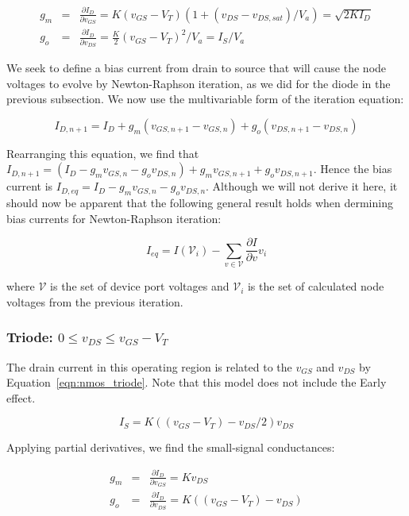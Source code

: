 \documentclass{article}
\begin{document}
\begin{eqnarray}
g_m&=&\frac{\partial I_D}{\partial v_{GS}}=K(v_{GS}-V_T)(1+(v_{DS}-v_{DS,sat})/V_a)=\sqrt{2KI_D} \\
g_o&=&\frac{\partial I_D}{\partial v_{DS}}=\frac{K}{2}(v_{GS}-V_T)^2 / V_a=I_S/V_a
\end{eqnarray}

We seek to define a bias current from drain to source that will cause the node voltages to evolve by Newton-Raphson iteration, as we did for the diode in the previous subsection.  We now use the multivariable form of the iteration equation:

\begin{equation}
I_{D,n+1}=I_D+g_m(v_{GS,n+1}-v_{GS,n})+g_o(v_{DS,n+1}-v_{DS,n})
\end{equation}

Rearranging this equation, we find that $I_{D,n+1}=(I_D-g_mv_{GS,n}-g_ov_{DS,n})+g_mv_{GS,n+1}+g_ov_{DS,n+1}$.  Hence the bias current is $I_{D,eq}=I_D-g_mv_{GS,n}-g_ov_{DS,n}$.  Although we will not derive it here, it should now be apparent that the following general result holds when dermining bias currents for Newton-Raphson iteration:

\begin{equation}
\label{eqn:bias_current}
I_{eq}=I(\mathcal{V}_i)-\sum_{v \in \mathcal{V}}\frac{\partial I}{\partial v}v_i
\end{equation}

where $\mathcal{V}$ is the set of device port voltages and $\mathcal{V}_i$ is the set of calculated node voltages from the previous iteration.

\subsubsection{Triode: $ 0 \leq v_{DS} \leq v_{GS}-V_T $}

The drain current in this operating region is related to the $v_{GS}$ and $v_{DS}$ by Equation~\ref{eqn:nmos_triode}.  Note that this model does not include the Early effect.

\begin{equation}
\label{eqn:nmos_triode}
I_S=K((v_{GS}-V_T)-v_{DS}/2)v_{DS}
\end{equation}

Applying partial derivatives, we find the small-signal conductances:

\begin{eqnarray}
g_m&=&\frac{\partial I_D}{\partial v_{GS}}=Kv_{DS} \\
g_o&=&\frac{\partial I_D}{\partial v_{DS}}=K((v_{GS}-V_T)-v_{DS})
\end{eqnarray}
\end{document}
